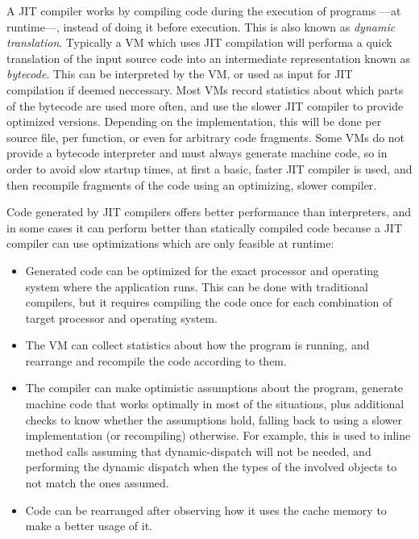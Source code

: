 A \gls{JIT} compiler works by compiling code during the execution of programs
—at runtime—, instead of doing it before execution. This is also known as
\emph{dynamic translation}. Typically a VM which uses JIT compilation will
performa a quick translation of the input source code into an intermediate
representation known as \emph{bytecode}. This can be interpreted by the VM, or
used as input for JIT compilation if deemed neccessary. Most VMs record
statistics about which parts of the bytecode are used more often, and use the
slower JIT compiler to provide optimized versions. Depending on the
implementation, this will be done per source file, per function, or even for
arbitrary code fragments. Some VMs do not provide a bytecode interpreter and
must always generate machine code, so in order to avoid slow startup times, at
first a basic, faster JIT compiler is used, and then recompile fragments of
the code using an optimizing, slower compiler.

Code generated by JIT compilers offers better performance than interpreters,
and in some cases it can perform better than statically compiled code because
a JIT compiler can use optimizations which are only feasible at runtime:

\begin{itemize}

	\item Generated code can be optimized for the exact processor and operating
	system where the application runs. This can be done with traditional
	compilers, but it requires compiling the code once for each combination of
	target processor and operating system.

	\item The VM can collect statistics about how the program is running, and
	rearrange and recompile the code according to them.

	\item The compiler can make optimistic assumptions about the program,
	generate machine code that works optimally in most of the situations, plus
	additional checks to know whether the assumptions hold, falling back to
	using a slower implementation (or recompiling) otherwise. For example, this
	is used to inline method calls assuming that \gls{dynamic-dispatch} will not
	be needed, and performing the dynamic dispatch when the types of the
	involved objects to not match the ones assumed.

	\item Code can be rearranged after observing how it uses the cache memory to
	make a better usage of it.

\end{itemize}

